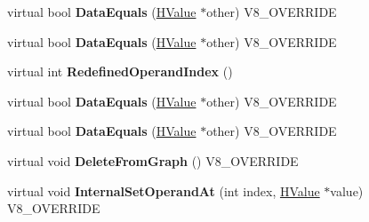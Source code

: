 \begin{DoxyCompactItemize}
\item 
\hypertarget{classv8_1_1internal_1_1_v8___f_i_n_a_l_a7f4d45af1c12067191189fb1f32db617}{}virtual bool {\bfseries Data\+Equals} (\hyperlink{classv8_1_1internal_1_1_h_value}{H\+Value} $\ast$other) V8\+\_\+\+O\+V\+E\+R\+R\+I\+D\+E\label{classv8_1_1internal_1_1_v8___f_i_n_a_l_a7f4d45af1c12067191189fb1f32db617}

\item 
\hypertarget{classv8_1_1internal_1_1_v8___f_i_n_a_l_a7f4d45af1c12067191189fb1f32db617}{}virtual bool {\bfseries Data\+Equals} (\hyperlink{classv8_1_1internal_1_1_h_value}{H\+Value} $\ast$other) V8\+\_\+\+O\+V\+E\+R\+R\+I\+D\+E\label{classv8_1_1internal_1_1_v8___f_i_n_a_l_a7f4d45af1c12067191189fb1f32db617}

\item 
\hypertarget{classv8_1_1internal_1_1_v8___f_i_n_a_l_ae8dec44d4438a5c5137ae8c23a80aa91}{}virtual int {\bfseries Redefined\+Operand\+Index} ()\label{classv8_1_1internal_1_1_v8___f_i_n_a_l_ae8dec44d4438a5c5137ae8c23a80aa91}

\item 
\hypertarget{classv8_1_1internal_1_1_v8___f_i_n_a_l_a7f4d45af1c12067191189fb1f32db617}{}virtual bool {\bfseries Data\+Equals} (\hyperlink{classv8_1_1internal_1_1_h_value}{H\+Value} $\ast$other) V8\+\_\+\+O\+V\+E\+R\+R\+I\+D\+E\label{classv8_1_1internal_1_1_v8___f_i_n_a_l_a7f4d45af1c12067191189fb1f32db617}

\item 
\hypertarget{classv8_1_1internal_1_1_v8___f_i_n_a_l_a7f4d45af1c12067191189fb1f32db617}{}virtual bool {\bfseries Data\+Equals} (\hyperlink{classv8_1_1internal_1_1_h_value}{H\+Value} $\ast$other) V8\+\_\+\+O\+V\+E\+R\+R\+I\+D\+E\label{classv8_1_1internal_1_1_v8___f_i_n_a_l_a7f4d45af1c12067191189fb1f32db617}

\item 
\hypertarget{classv8_1_1internal_1_1_v8___f_i_n_a_l_a9f1d24bf04aa5a5c7190aa840712dbcd}{}virtual void {\bfseries Delete\+From\+Graph} () V8\+\_\+\+O\+V\+E\+R\+R\+I\+D\+E\label{classv8_1_1internal_1_1_v8___f_i_n_a_l_a9f1d24bf04aa5a5c7190aa840712dbcd}

\item 
\hypertarget{classv8_1_1internal_1_1_v8___f_i_n_a_l_a38952305f91686c7dfc731fc86554988}{}virtual void {\bfseries Internal\+Set\+Operand\+At} (int index, \hyperlink{classv8_1_1internal_1_1_h_value}{H\+Value} $\ast$value) V8\+\_\+\+O\+V\+E\+R\+R\+I\+D\+E\label{classv8_1_1internal_1_1_v8___f_i_n_a_l_a38952305f91686c7dfc731fc86554988}


\end{DoxyCompactItemize}
